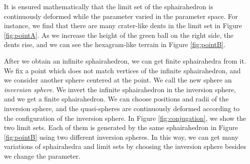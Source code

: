 It is ensured mathematically that the limit set of the
sphairahedron is continuously deformed while the parameter varied
in the parameter space.
For instance, we find that there are many crater-like dents in the limit
set in Figure \ref{fig:pointA}.
As we increase the height of the green ball on the right side, the dents
rise, and we can see the hexagram-like terrain in Figure
\ref{fig:pointB}.

After we obtain an infinite sphairahedron, we can get
finite sphairahedra from it.
We fix a point which does not match vertices of the infinite
sphairahedron, and we consider another sphere centered at the point.
We call the new sphere an \textit{inversion sphere}.
We invert the infinite sphairahedron in the inversion sphere, and we get
a finite sphairahedron.
We can choose positions and radii of the inversion sphere, and
the quasi-spheres are continuously deformed according to the
configuration of the inversion sphere.
In Figure \ref{fig:conjugation}, we show the two limit sets.
Each of them is generated by the same sphairahedron in Figure
\ref{fig:pointB} using two different inversion spheres.
In this way, we can get many variations of sphairahedra and limit sets
by choosing the inversion sphere besides we change the parameter.


